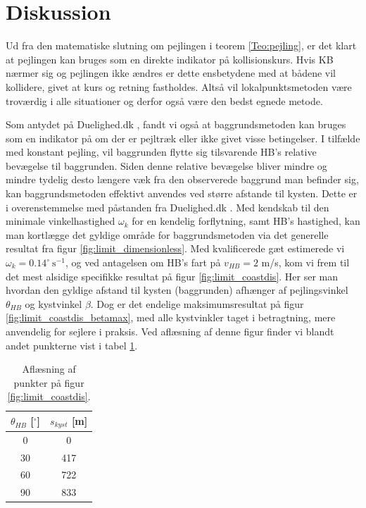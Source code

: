\documentclass[%
 reprint,
nofootinbib,
aps,
]{revtex4-1}
\begin{document}
\section{Diskussion}
Ud fra den matematiske slutning om pejlingen i teorem \ref{Teo:pejling}, er det klart at pejlingen kan bruges som en direkte indikator på kollisionskurs. Hvis KB nærmer sig og pejlingen ikke ændres er dette ensbetydene med at bådene vil kollidere, givet at kurs og retning fastholdes. Altså vil lokalpunktsmetoden være troværdig i alle situationer og derfor også være den bedst egnede metode. \par
Som antydet på Duelighed.dk \cite{duelighed}, fandt vi også at baggrundsmetoden kan bruges som en indikator på om der er pejltræk eller ikke givet visse betingelser. I tilfælde med konstant pejling, vil baggrunden flytte sig tilsvarende HB's relative bevægelse til baggrunden. Siden denne relative bevægelse bliver mindre og mindre tydelig desto længere væk fra den observerede baggrund man befinder sig, kan baggrundsmetoden effektivt anvendes ved større afstande til kysten. Dette er i overenstemmelse med påstanden fra Duelighed.dk \cite{duelighed}. Med kendskab til den minimale vinkelhastighed $\omega_k$ for en kendelig forflytning, samt HB's hastighed, kan man kortlægge det gyldige område for baggrundsmetoden via det generelle resultat fra figur \ref{fig:limit_dimensionless}. Med kvalificerede gæt estimerede vi $\omega_k = 0.14^{\circ}\ \text{s}^{-1}$, og ved antagelsen om HB's fart på $v_{HB} = 2$ m/s, kom vi frem til det mest alsidige specifikke resultat på figur \ref{fig:limit_coastdis}. Her ser man hvordan den gyldige afstand til kysten (baggrunden) afhænger af pejlingsvinkel $\theta_{HB}$ og kystvinkel $\beta$. Dog er det endelige maksimumsresultat på figur \ref{fig:limit_coastdis_betamax}, med alle kystvinkler taget i betragtning, mere anvendelig for sejlere i praksis. Ved aflæsning af denne figur finder vi blandt andet punkterne vist i tabel \ref{tab:valid_area}.
\begin{table}[H]
 \begin{center}
 \caption{Aflæsning af punkter på figur \ref{fig:limit_coastdis}.}
 \begin{tabular}{|c|c|} \hline
 $\theta_{HB}$ [$^{\circ}$] & $s_{kyst}$ [m]  \\ \hline
 0 & 0 \\ \hline
 30 & 417 \\ \hline
 60 & 722  \\ \hline
 90 & 833 \\ \hline
 \end{tabular}
 \end{center}
 \label{tab:valid_area}
\end{table}
\end{document}

